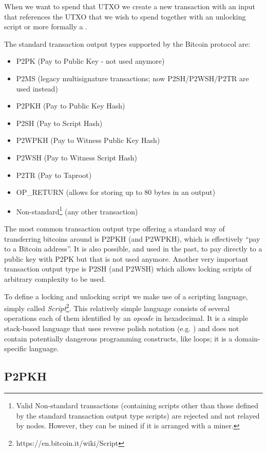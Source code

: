 When we want to spend that UTXO we create a new transaction with an input that references the UTXO that we wish to spend together with an unlocking script or more formally a .

The standard transaction output types supported by the Bitcoin protocol are:

\begin{itemize}
\item P2PK (Pay to Public Key - not used anymore)
\item P2MS (legacy multisignature transactions; now P2SH/P2WSH/P2TR are used instead)
\item P2PKH (Pay to Public Key Hash)
\item P2SH (Pay to Script Hash)
\item P2WPKH (Pay to Witness Public Key Hash)
\item P2WSH (Pay to Witness Script Hash)
\item P2TR (Pay to Taproot)
\item OP\_RETURN (allows for storing up to 80 bytes in an output)
\item Non-standard\footnote{Valid Non-standard transactions (containing scripts other than those defined by the standard transaction output type scripts) are rejected and not relayed by nodes. However, they can be mined if it is arranged with a miner.} (any other transaction)
\end{itemize}

The most common transaction output type offering a standard way of transferring bitcoins around is P2PKH (and P2WPKH), which is effectively ``pay to a Bitcoin address''. It is also possible, and used in the past, to pay directly to a public key with P2PK but that is not used anymore. Another very important transaction output type is P2SH (and P2WSH) which allows locking scripts of arbitrary complexity to be used.

To define a locking and unlocking script we make use of a scripting language, simply called \emph{Script}\footnote{https://en.bitcoin.it/wiki/Script}. This relatively simple language consists of several operations each of them identified by an \emph{opcode} in hexadecimal. It is a simple stack-based language that uses reverse polish notation (e.g. ) and does not contain potentially dangerous programming constructs, like loops; it is a domain-specific language.

\subsection*{P2PKH}

